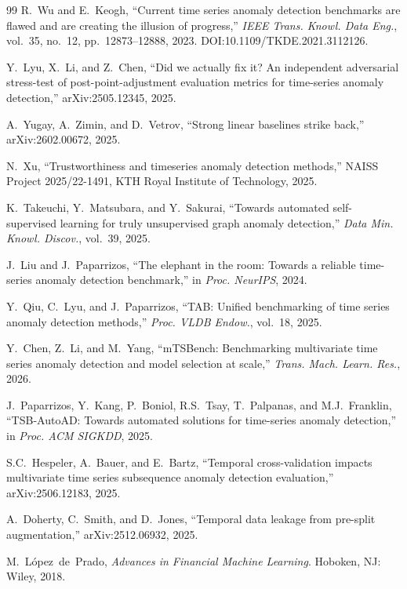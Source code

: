 \documentclass[preprint,12pt]{elsarticle}
\begin{document}
\begin{thebibliography}{99}
R.~Wu and E.~Keogh, ``Current time series anomaly detection benchmarks are flawed and are creating the illusion of progress,'' \emph{IEEE Trans. Knowl. Data Eng.}, vol.~35, no.~12, pp.~12873--12888, 2023. DOI:10.1109/TKDE.2021.3112126.

Y.~Lyu, X.~Li, and Z.~Chen, ``Did we actually fix it? An independent adversarial stress-test of post-point-adjustment evaluation metrics for time-series anomaly detection,'' arXiv:2505.12345, 2025.

A.~Yugay, A.~Zimin, and D.~Vetrov, ``Strong linear baselines strike back,'' arXiv:2602.00672, 2025.

N.~Xu, ``Trustworthiness and timeseries anomaly detection methods,'' NAISS Project 2025/22-1491, KTH Royal Institute of Technology, 2025.

K.~Takeuchi, Y.~Matsubara, and Y.~Sakurai, ``Towards automated self-supervised learning for truly unsupervised graph anomaly detection,'' \emph{Data Min. Knowl. Discov.}, vol.~39, 2025.

J.~Liu and J.~Paparrizos, ``The elephant in the room: Towards a reliable time-series anomaly detection benchmark,'' in \emph{Proc. NeurIPS}, 2024.

Y.~Qiu, C.~Lyu, and J.~Paparrizos, ``TAB: Unified benchmarking of time series anomaly detection methods,'' \emph{Proc. VLDB Endow.}, vol.~18, 2025.

Y.~Chen, Z.~Li, and M.~Yang, ``mTSBench: Benchmarking multivariate time series anomaly detection and model selection at scale,'' \emph{Trans. Mach. Learn. Res.}, 2026.

J.~Paparrizos, Y.~Kang, P.~Boniol, R.S.~Tsay, T.~Palpanas, and M.J.~Franklin, ``TSB-AutoAD: Towards automated solutions for time-series anomaly detection,'' in \emph{Proc. ACM SIGKDD}, 2025.

S.C.~Hespeler, A.~Bauer, and E.~Bartz, ``Temporal cross-validation impacts multivariate time series subsequence anomaly detection evaluation,'' arXiv:2506.12183, 2025.

A.~Doherty, C.~Smith, and D.~Jones, ``Temporal data leakage from pre-split augmentation,'' arXiv:2512.06932, 2025.

M.~L\'{o}pez~de~Prado, \emph{Advances in Financial Machine Learning}. Hoboken, NJ: Wiley, 2018.


\end{thebibliography}
\end{document}
